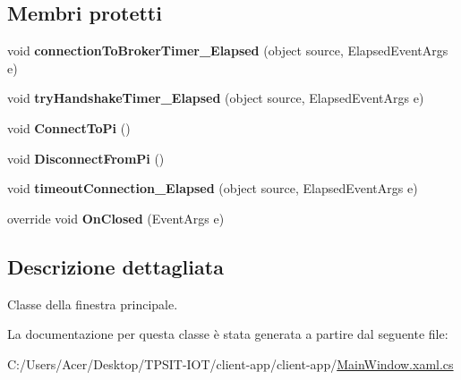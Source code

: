 \subsection*{Membri protetti}
\begin{DoxyCompactItemize}
\item 
\mbox{\label{class_main_window_a086a7f8f6daa013cd344501ec5aaa06e}} 
void {\bfseries connection\+To\+Broker\+Timer\+\_\+\+Elapsed} (object source, Elapsed\+Event\+Args e)
\item 
\mbox{\label{class_main_window_ababd41cfc28df8e14121c00b7146d836}} 
void {\bfseries try\+Handshake\+Timer\+\_\+\+Elapsed} (object source, Elapsed\+Event\+Args e)
\item 
\mbox{\label{class_main_window_a8df5ba47f789197fbf79f019e91c225e}} 
void {\bfseries Connect\+To\+Pi} ()
\item 
\mbox{\label{class_main_window_ac862b0f48dc5fea63eb64d6d16628a0e}} 
void {\bfseries Disconnect\+From\+Pi} ()
\item 
\mbox{\label{class_main_window_a1550e77b2a30ceb7c7b85d83a9aecc9a}} 
void {\bfseries timeout\+Connection\+\_\+\+Elapsed} (object source, Elapsed\+Event\+Args e)
\item 
\mbox{\label{class_main_window_a7f01febc0a6050ed1438c97d39ea49ea}} 
override void {\bfseries On\+Closed} (Event\+Args e)
\end{DoxyCompactItemize}


\subsection{Descrizione dettagliata}
Classe della finestra principale. 

La documentazione per questa classe è stata generata a partire dal seguente file\+:\begin{DoxyCompactItemize}
\item 
C\+:/\+Users/\+Acer/\+Desktop/\+T\+P\+S\+I\+T-\/\+I\+O\+T/client-\/app/client-\/app/\mbox{\hyperlink{_main_window_8xaml_8cs}{Main\+Window.\+xaml.\+cs}}\end{DoxyCompactItemize}
